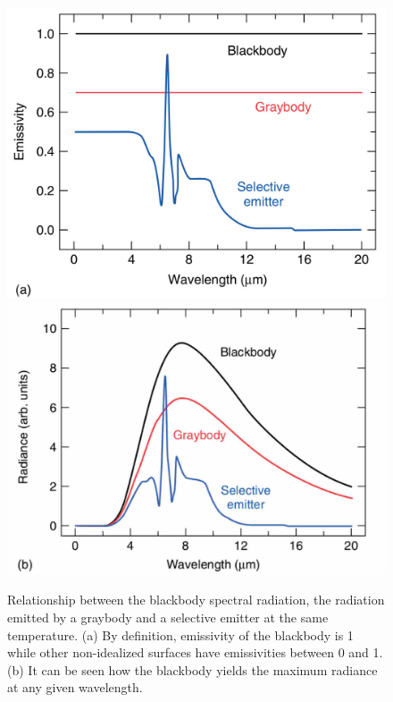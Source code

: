 		\begin{figure}[ht!]
			\centering
			\captionsetup{justification=centering,margin=2cm}
			\includegraphics[scale=0.177]{Figures/Chapter01/BlackAndGreybodyComparison02.jpg}
			\includegraphics[scale=0.28]{Figures/Chapter01/BlackAndGreybodyComparison01.jpg}
			\caption{Relationship between the blackbody spectral radiation, the radiation emitted by a graybody and a selective emitter at the same temperature. (a) By definition, emissivity of the blackbody is 1 while other non-idealized surfaces have emissivities between 0 and 1. (b) It can be seen how the blackbody yields the maximum radiance at any given wavelength.}\label{fig1.4}
		\end{figure}
		
